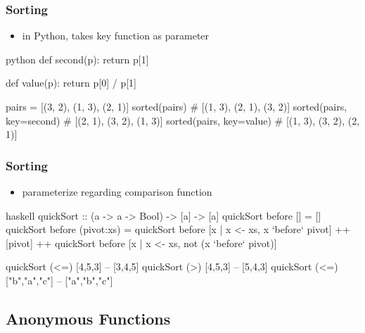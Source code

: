 \documentclass[dvipsnames]{beamer}
\theoremstyle{plain}
\begin{document}
\begin{frame}[fragile]
  \frametitle{Sorting}

  \begin{itemize}
    \item in Python,  takes key function as parameter
  \end{itemize}

  \begin{exampleblock}{}
    \begin{pygments}{python}
def second(p):
    return p[1]

def value(p):
    return p[0] / p[1]

pairs = [(3, 2), (1, 3), (2, 1)]
sorted(pairs)              # [(1, 3), (2, 1), (3, 2)]
sorted(pairs, key=second)  # [(2, 1), (3, 2), (1, 3)]
sorted(pairs, key=value)   # [(1, 3), (3, 2), (2, 1)]
    \end{pygments}
  \end{exampleblock}
\end{frame}

\begin{frame}[fragile]
  \frametitle{Sorting}

  \begin{itemize}
    \item parameterize  regarding comparison
      function
  \end{itemize}

  \begin{exampleblock}{}
    \begin{pygments}{haskell}
quickSort :: (a -> a -> Bool) -> [a] -> [a]
quickSort before []         = []
quickSort before (pivot:xs) =
    quickSort before [x | x <- xs, x `before` pivot]
    ++ [pivot]
    ++ quickSort before [x | x <- xs,
                             not (x `before` pivot)]

quickSort (<=) [4,5,3]       -- [3,4,5]
quickSort (>)  [4,5,3]       -- [5,4,3]
quickSort (<=) ["b","a","c"] -- ["a","b","c"]
    \end{pygments}
  \end{exampleblock}
\end{frame}

\subsection{Anonymous Functions}
\end{document}
